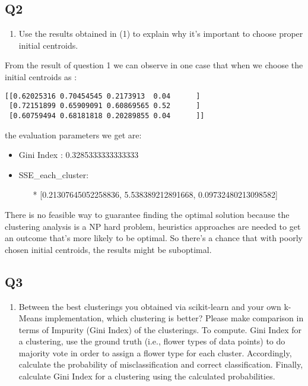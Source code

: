 \documentclass[11pt]{article}
\providecommand{\tightlist}{%
      \setlength{\itemsep}{0pt}\setlength{\parskip}{0pt}}
\begin{document}
    
    
    
    \subsection*{Q2}\label{q2}

\begin{enumerate}
\def\labelenumi{\arabic{enumi}.}
\setcounter{enumi}{1}
\tightlist
\item
  Use the results obtained in (1) to explain why it's important to
  choose proper initial centroids.
\end{enumerate}

    From the result of question 1 we can observe in one case that when we
choose the initial centroids as :

\begin{verbatim}
[[0.62025316 0.70454545 0.2173913  0.04      ]
 [0.72151899 0.65909091 0.60869565 0.52      ]
 [0.60759494 0.68181818 0.20289855 0.04      ]]
\end{verbatim}

the evaluation parameters we get are:

\begin{itemize}
\tightlist
\item
  Gini Index : 0.3285333333333333
\item
  SSE\_each\_cluster:

  \begin{itemize}
  \tightlist
  \item[*]
    {[}0.21307645052258836, 5.538389212891668, 0.09732480213098582{]}
  \end{itemize}
\end{itemize}

There is no feasible way to guarantee finding the optimal solution
because the clustering analysis is a NP hard problem, heuristics
approaches are needed to get an outcome that's more likely to be
optimal. So there's a chance that with poorly chosen initial centroids,
the results might be suboptimal.

    \subsection*{Q3}\label{q3}

\begin{enumerate}
\def\labelenumi{\arabic{enumi}.}
\setcounter{enumi}{2}
\tightlist
\item
  Between the best clusterings you obtained via scikit-learn and your
  own k-Means implementation, which clustering is better? Please make
  comparison in terms of Impurity (Gini Index) of the clusterings. To
  compute. Gini Index for a clustering, use the ground truth (i.e.,
  flower types of data points) to do majority vote in order to assign a
  flower type for each cluster. Accordingly, calculate the probability
  of misclassification and correct classification. Finally, calculate
  Gini Index for a clustering using the calculated probabilities.
\end{enumerate}
\end{document}
